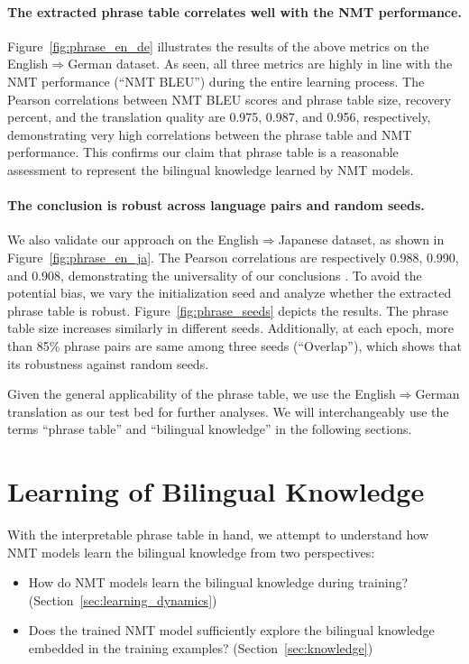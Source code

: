\documentclass[11pt,a4paper]{article}
\begin{document}
\paragraph{The extracted phrase table correlates well with the NMT performance.} Figure~\ref{fig:phrase_en_de} illustrates the results of the above metrics on the English$\Rightarrow$German dataset.
As seen, all three metrics are highly in line with the NMT performance (``NMT BLEU'') during the entire learning process. 
The Pearson correlations between NMT BLEU scores and phrase table size, recovery percent, and the translation quality are 0.975, 0.987, and 0.956, respectively, demonstrating very high correlations between the phrase table and NMT performance. This confirms our claim that phrase table is a reasonable assessment to represent the bilingual knowledge learned by NMT models.


\paragraph{The conclusion is robust across language pairs and random seeds.} 
We also validate our approach on the English$\Rightarrow$Japanese dataset, as shown in Figure~\ref{fig:phrase_en_ja}. 
The Pearson correlations are respectively 0.988, 0.990, and 0.908, demonstrating the universality of our conclusions .
To avoid the potential bias, we vary the initialization seed and analyze whether the extracted phrase table is robust. Figure~\ref{fig:phrase_seeds} depicts the results. The phrase table size increases similarly in different seeds. Additionally, at each epoch, more than 85\% phrase pairs are same among three seeds  (``Overlap''), which shows that its robustness against random seeds. 

Given the general applicability of the phrase table, we use the English$\Rightarrow$German translation as our test bed for further analyses. We will interchangeably use the terms ``phrase table'' and ``bilingual knowledge'' in the following sections.


\section{Learning of Bilingual Knowledge}
\label{sec:analyze}
With the interpretable phrase table in hand, we attempt to understand how NMT models learn the bilingual knowledge from two perspectives:
\begin{itemize}
    \item How do NMT models learn the bilingual knowledge during training? (Section~\ref{sec:learning_dynamics})
    \item Does the trained NMT model sufficiently explore the bilingual knowledge embedded in the training examples? (Section~\ref{sec:knowledge})
\end{itemize}
\end{document}
